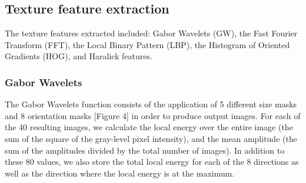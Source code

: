 \subsection{Texture feature extraction}


The texture features extracted included: Gabor Wavelets\cite{Zheng_2004} (GW), the Fast Fourier Transform (FFT), the Local Binary Pattern (LBP), the Histogram of Oriented Gradients (HOG), and Haralick features.

\subsubsection{Gabor Wavelets}

The Gabor Wavelets function consists of the application of 5 different size masks and 8 orientation masks [Figure 4] in order to produce output images. For each of the 40 resulting images, we calculate the local energy over the entire image (the sum of the square of the gray-level pixel intensity), and the mean amplitude (the sum of the amplitudes divided by the total number of images). In addition to these 80 values, we also store the total local energy for each of the 8 directions as well as the direction where the local energy is at the maximum.

  
  